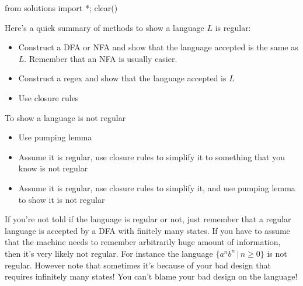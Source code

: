 \begin{python0}
from solutions import *; clear()
\end{python0}

Here's a quick summary of methods to show a language $L$ is
regular:
\begin{itemize}
 \item Construct a DFA or NFA and show that the language accepted
 is the same as $L$. Remember that an NFA is usually easier.
 \item Construct a regex and show that the language accepted is
 $L$
 \item Use closure rules
\end{itemize}

To show a language is not regular
\begin{itemize}
 \item Use pumping lemma
 \item Assume it is regular, use closure rules to simplify it to
 something that you know is not regular
 \item Assume it is regular, use closure rules to simplify it, and
 use pumping lemma to show it is not regular
\end{itemize}

If you're not told if the language is regular or not, just
remember that a regular language is accepted by a DFA with
finitely many states. If you have to assume that the machine needs
to remember arbitrarily huge amount of information, then it's very
likely not regular. For instance the language $\{a^nb^n \,|\, n
\geq 0\}$ is not regular. However note that sometimes it's because
of your bad design that requires infinitely many states! You can't
blame your bad design on the language!
